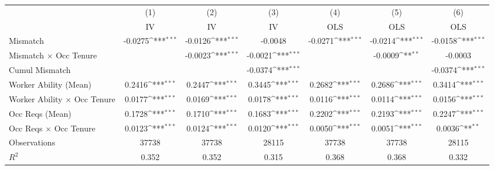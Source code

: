 {
\def\sym#1{\ifmmode^{#1}\else\(^{#1}\)\fi}
\begin{tabular}{l*{6}{c}}
\hline  
                    &\multicolumn{1}{c}{(1)}&\multicolumn{1}{c}{(2)}&\multicolumn{1}{c}{(3)}&\multicolumn{1}{c}{(4)}&\multicolumn{1}{c}{(5)}&\multicolumn{1}{c}{(6)}\\
                    &\multicolumn{1}{c}{IV}&\multicolumn{1}{c}{IV}&\multicolumn{1}{c}{IV}&\multicolumn{1}{c}{OLS}&\multicolumn{1}{c}{OLS}&\multicolumn{1}{c}{OLS}\\
\hline  
Mismatch            &     -0.0275\sym{***}&     -0.0126\sym{***}&     -0.0048         &     -0.0271\sym{***}&     -0.0214\sym{***}&     -0.0158\sym{***}\\
[1em]
Mismatch $\times$ Occ Tenure&                     &     -0.0023\sym{***}&     -0.0021\sym{***}&                     &     -0.0009\sym{**} &     -0.0003         \\
[1em]
Cumul Mismatch      &                     &                     &     -0.0374\sym{***}&                     &                     &     -0.0374\sym{***}\\
[1em]
Worker Ability (Mean)&      0.2416\sym{***}&      0.2447\sym{***}&      0.3445\sym{***}&      0.2682\sym{***}&      0.2686\sym{***}&      0.3414\sym{***}\\
[1em]
Worker Ability $\times$ Occ Tenure&      0.0177\sym{***}&      0.0169\sym{***}&      0.0178\sym{***}&      0.0116\sym{***}&      0.0114\sym{***}&      0.0156\sym{***}\\
[1em]
Occ Reqs (Mean)     &      0.1728\sym{***}&      0.1710\sym{***}&      0.1683\sym{***}&      0.2202\sym{***}&      0.2193\sym{***}&      0.2247\sym{***}\\
[1em]
Occ Reqs $\times$ Occ Tenure&      0.0123\sym{***}&      0.0124\sym{***}&      0.0120\sym{***}&      0.0050\sym{***}&      0.0051\sym{***}&      0.0036\sym{**} \\
\hline  
Observations        &       37738         &       37738         &       28115         &       37738         &       37738         &       28115         \\
\(R^{2}\)           &       0.352         &       0.352         &       0.315         &       0.368         &       0.368         &       0.332         \\
\hline  
\end{tabular}
}
